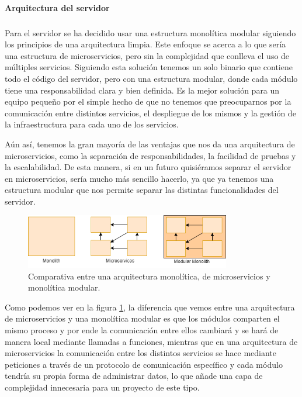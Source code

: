 \paragraph{Arquitectura del servidor}
\subparagraph{}
Para el servidor se ha decidido usar una estructura monolítica modular siguiendo los principios de una arquitectura limpia.
Este enfoque se acerca a lo que sería una estructura de microservicios, pero sin la complejidad que conlleva el uso de múltiples servicios.
Siguiendo esta solución tenemos un solo binario que contiene todo el código del servidor, pero con una estructura modular, donde cada módulo tiene una responsabilidad clara y bien definida.
Es la mejor solución para un equipo pequeño por el simple hecho de que no tenemos que preocuparnos por la comunicación entre distintos servicios, el despliegue de los mismos y la gestión de la infraestructura para cada uno de los servicios.

Aún así, tenemos la gran mayoría de las ventajas que nos da una arquitectura de microservicios, como la separación de responsabilidades, la facilidad de pruebas y la escalabilidad.
De esta manera, si en un futuro quisiéramos separar el servidor en microservicios, sería mucho más sencillo hacerlo, ya que ya tenemos una estructura modular que nos permite separar las distintas funcionalidades del servidor.


\begin{figure}[H]
  \centering
  \includegraphics[width=0.8\textwidth]{assets/modular-monolith-comparison.png}
  \caption{Comparativa entre una arquitectura monolítica, de microservicios y monolítica modular. \parencite{tsechelidis2023modular}}
  \label{fig:modular-monolith-comparison}
\end{figure}

Como podemos ver en la figura \ref{fig:modular-monolith-comparison}, la diferencia que vemos entre una arquitectura de microservicios y una monolítica modular es que los módulos comparten el mismo proceso y por ende la comunicación entre ellos cambiará y se hará de manera local mediante llamadas a funciones, mientras que en una arquitectura de microservicios la comunicación entre los distintos servicios se hace mediante peticiones a través de un protocolo de comunicación específico y cada módulo tendría su propia forma de administrar datos, lo que añade una capa de complejidad innecesaria para un proyecto de este tipo.

